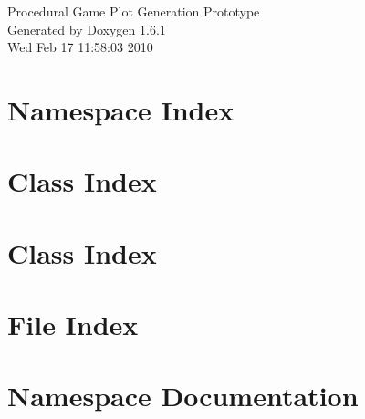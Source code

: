 \documentclass[a4paper]{book}
\begin{document}
\hypersetup{pageanchor=false}
\begin{titlepage}
\vspace*{7cm}
\begin{center}
{\Large Procedural Game Plot Generation Prototype }\\
\vspace*{1cm}
{\large Generated by Doxygen 1.6.1}\\
\vspace*{0.5cm}
{\small Wed Feb 17 11:58:03 2010}\\
\end{center}
\end{titlepage}
\clearemptydoublepage
{}
\tableofcontents
\clearemptydoublepage
{}
\hypersetup{pageanchor=true}
\chapter{Namespace Index}

\chapter{Class Index}

\chapter{Class Index}

\chapter{File Index}

\chapter{Namespace Documentation}


\end{document}
